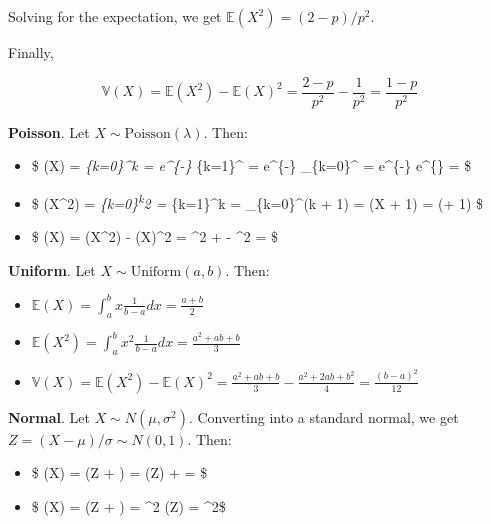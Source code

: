 Solving for the expectation, we get \(\mathbb{E}(X^2) = (2 - p) / p^2\).

Finally,

\[ \mathbb{V}(X) = \mathbb{E}(X^2) - \mathbb{E}(X)^2 = \frac{2 - p}{p^2} - \frac{1}{p^2} = \frac{1 - p}{p^2} \]

\textbf{Poisson}. Let \(X \sim \text{Poisson}(\lambda)\). Then:

\begin{itemize}
\item
  \$ (X) = \sum\emph{\{k=0\}\^{}\infty k
   = \lambda e\^{}\{-\lambda\}
  \sum}\{k=1\}\^{}\infty {} =
  \lambda e\^{}\{-\lambda\} \sum\_\{k=0\}\^{}\infty {}
  = \lambda e\^{}\{-\lambda\} e\^{}\{\lambda\} = \lambda \$
\item
  \$ (X\^{}2) = \sum\emph{\{k=0\}\textsuperscript{\infty k}2
   = \lambda \sum}\{k=1\}\^{}\infty k
   =
  \lambda \sum\_\{k=0\}\^{}\infty (k + 1)
   = \lambda {}(X + 1) =
  \lambda(\lambda + 1) \$
\item
  \$ (X) = (X\^{}2) - (X)\^{}2 =
  \lambda\^{}2 + \lambda - \lambda\^{}2 = \lambda \$
\end{itemize}

\textbf{Uniform}. Let \(X \sim \text{Uniform}(a, b)\). Then:

\begin{itemize}[tightlist]
\item
  \(\mathbb{E}(X) = \int_a^b x \frac{1}{b - a} dx = \frac{a + b}{2}\)
\item
  \(\mathbb{E}(X^2) = \int_a^b x^2 \frac{1}{b - a} dx = \frac{a^2 + ab + b}{3}\)
\item
  \(\mathbb{V}(X) = \mathbb{E}(X^2) - \mathbb{E}(X)^2 = \frac{a^2 + ab + b}{3} - \frac{a^2 + 2ab + b^2}{4} = \frac{(b - a)^2}{12}\)
\end{itemize}

\textbf{Normal}. Let \(X \sim N(\mu, \sigma^2)\). Converting into a
standard normal, we get \(Z = (X - \mu) / \sigma \sim N(0, 1)\). Then:

\begin{itemize}[tightlist]
\item
  \$ (X) = (\sigma Z + \mu) = \sigma {}(Z) +
  \mu = \mu\$
\item
  \$ (X) = (\sigma Z + \mu) = \sigma\^{}2
  (Z) = \sigma\^{}2\$
\end{itemize}

